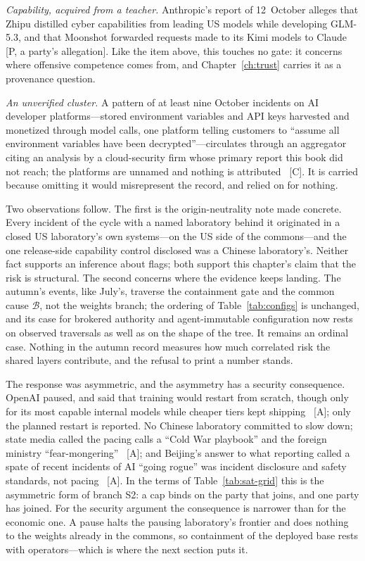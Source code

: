 \emph{Capability, acquired from a teacher.} Anthropic's report of 12~October alleges that Zhipu distilled cyber capabilities from leading US models while developing GLM-5.3, and that Moonshot forwarded requests made to its Kimi models to Claude~\cite{mdl-anthropic-distill-oct} [P, a party's allegation]. Like the item above, this touches no gate: it concerns where offensive competence comes from, and Chapter~\ref{ch:trust} carries it as a provenance question.

\emph{An unverified cluster.} A pattern of at least nine October incidents on AI developer platforms---stored environment variables and API keys harvested and monetized through model calls, one platform telling customers to ``assume all environment variables have been decrypted''---circulates through an aggregator citing an analysis by a cloud-security firm whose primary report this book did not reach; the platforms are unnamed and nothing is attributed~\cite{gov-black-october} [C]. It is carried because omitting it would misrepresent the record, and relied on for nothing.

Two observations follow. The first is the origin-neutrality note made concrete. Every incident of the cycle with a named laboratory behind it originated in a closed US laboratory's own systems---on the US side of the commons---and the one release-side capability control disclosed was a Chinese laboratory's. Neither fact supports an inference about flags; both support this chapter's claim that the risk is structural. The second concerns where the evidence keeps landing. The autumn's events, like July's, traverse the containment gate and the common cause $\mathcal{B}$, not the weights branch; the ordering of Table~\ref{tab:configs} is unchanged, and its case for brokered authority and agent-immutable configuration now rests on observed traversals as well as on the shape of the tree. It remains an ordinal case. Nothing in the autumn record measures how much correlated risk the shared layers contribute, and the refusal to print a number stands.

The response was asymmetric, and the asymmetry has a security consequence. OpenAI paused, and said that training would restart from scratch, though only for its most capable internal models while cheaper tiers kept shipping~\cite{mdl-openai-pause2} [A]; only the planned restart is reported. No Chinese laboratory committed to slow down; state media called the pacing calls a ``Cold War playbook'' and the foreign ministry ``fear-mongering''~\cite{mdl-china-rejects-pacing} [A]; and Beijing's answer to what reporting called a spate of recent incidents of AI ``going rogue'' was incident disclosure and safety standards, not pacing~\cite{gov-ndrc-briefing} [A]. In the terms of Table~\ref{tab:sat-grid} this is the asymmetric form of branch S2: a cap binds on the party that joins, and one party has joined. For the security argument the consequence is narrower than for the economic one. A pause halts the pausing laboratory's frontier and does nothing to the weights already in the commons, so containment of the deployed base rests with operators---which is where the next section puts it.

